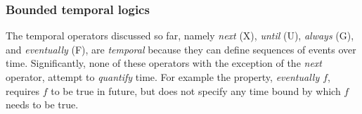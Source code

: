 \begin{comment}
\noindent
On the other hand, branching time logics are useful for verifying properties
over a given state machine. For example, when we develop an automotive control
system we may typically model the control system as an abstract state machine,
verify whether this control system satisfies certain safety properties and
then expand the abstract state machine into the actual control system.
When a branching time property fails, we must interpret the failure in terms
of the actual states of the system, which is not possible in black-box
testing.

\noindent
The temporal logic CTL$^*$ combines the expressive power of linear and
branching time temporal logics. CTL and LTL are fragments of CTL$^*$. There
has been several interesting extensions of these languages that demonstrate the
tradeoff between the expressive power of the language and the complexity of
model checking (that is, formally verifying) properties specified in these
languages.
\end{comment}

\subsubsection{Bounded temporal logics} \label{sec2.2.4}
\noindent
The temporal operators discussed so far, namely {\em next} (X), {\em until}
(U), {\em always} (G), and {\em eventually} (F), are {\em temporal} because
they can define sequences of events over time. Significantly, none of these 
operators with the exception of the {\em next} operator, attempt to 
{\em quantify} time. For example the property, {\em eventually $f$}, requires
$f$ to be true in future, but does not specify any time bound by which $f$
needs to be true.


